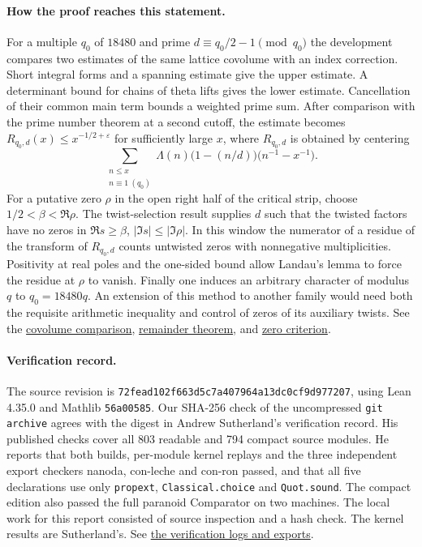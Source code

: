 \paragraph{How the proof reaches this statement.}
For a multiple $q_0$ of $18480$ and prime $d\equiv q_0/2-1\pmod {q_0}$ the development
compares two estimates of the same lattice covolume with an index correction.
Short integral forms and a spanning estimate give the upper estimate.
A determinant bound for chains of theta lifts gives the lower estimate.
Cancellation of their common main term bounds a weighted prime sum.
After comparison with the prime number theorem at a second cutoff, the estimate becomes
$R_{q_0,d}(x)\le x^{-1/2+\varepsilon}$ for sufficiently large $x$,
where $R_{q_0,d}$ is obtained by centering
\[
  \sum_{\substack{n\le x\\n\equiv1\ (q_0)}}\!
     \Lambda(n)\bigl(1-(n/d)\bigr)\bigl(n^{-1}-x^{-1}\bigr).
\]
For a putative zero $\rho$ in the open right half of the critical strip,
choose $1/2<\beta<\Re\rho$.
The twist-selection result supplies $d$ such that the twisted factors have no
zeros in $\Re s\ge\beta$, $|\Im s|\le|\Im\rho|$. In this window the
numerator of a residue of the transform of $R_{q_0,d}$ counts untwisted zeros
with nonnegative multiplicities. Positivity at real poles and the one-sided bound
allow Landau's lemma to force the residue at $\rho$ to vanish. Finally one
induces an arbitrary character of modulus $q$ to $q_0=18480q$.
An extension of this method to another family would need both the requisite
arithmetic inequality and control of zeros of its auxiliary twists.
See the
\href{https://github.com/lsernau/grh-lean/blob/72fead102f663d5c7a407964a13dc0cf9d977207/grh/src/New/Reduction/MainInequality.lean}{covolume comparison},
\href{https://github.com/lsernau/grh-lean/blob/72fead102f663d5c7a407964a13dc0cf9d977207/grh/src/New/Reduction/OneSidedBound.lean}{remainder theorem}, and
\href{https://github.com/lsernau/grh-lean/blob/72fead102f663d5c7a407964a13dc0cf9d977207/grh/src/New/Reduction/Zeros/Criterion.lean}{zero criterion}.

\paragraph{Verification record.}
The source revision is \texttt{72fead102f663d5c7a407964a13dc0cf9d977207},
using Lean 4.35.0 and Mathlib \texttt{56a00585}. Our SHA-256 check of the
uncompressed \texttt{git archive} agrees with the digest in Andrew Sutherland's
verification record. His published checks cover all 803 readable and 794 compact
source modules. He reports that both builds, per-module kernel replays and the
three independent export checkers nanoda, con-leche and con-ron passed,
and that all five declarations use only \texttt{propext}, \texttt{Classical.choice}
and \texttt{Quot.sound}. The compact edition also passed the full paranoid
Comparator on two machines. The local work for this report consisted of source
inspection and a hash check. The kernel results are Sutherland's. See
\href{https://math.mit.edu/~drew/shortgrh/}{the verification logs and exports}.
